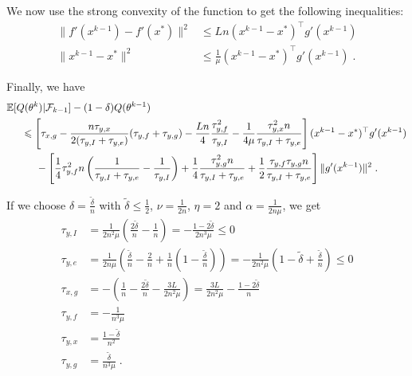 \documentclass{article}
\def\E{_{\scriptscriptstyle E}}
\def \E{{\mathbb E}}
\def \E{{\mathbb E}}
\begin{document}
We now use the strong convexity of the function to get the following inequalities:
\begin{align*}
\|f'(x^{k-1}) - f'(x^\ast)\|^2 & \leqslant Ln (x^{k-1} -x^\ast)^\top g'(x^{k-1})\\
\|x^{k-1} -x^\ast\|^2& \leqslant\frac{1}{\mu}(x^{k-1} -x^\ast)^\top g'(x^{k-1}) \; .
\end{align*}

Finally, we have
\begin{align*}
& \E [ Q(\theta^k) | \mathcal{F}_{k-1} ] - ( 1 - \delta) Q(\theta^{k-1}) \\
& \hspace*{.5cm} \leqslant \left[\tau_{x,g} - \frac{n\tau_{y,x}}{2(\tau_{y,I} + \tau_{y,e})}(\tau_{y,f} + \tau_{y,g}) -\frac{Ln}{4}\frac{\tau_{y, f}^2}{\tau_{y,I}}-\frac{1}{4\mu}\frac{\tau_{y,x}^2n}{\tau_{y,I} + \tau_{y,e}}\right](x^{k-1} -x^\ast)^\top g'(x^{k-1})\\
& \hspace*{1cm} -\left[\frac{1}{4}\tau_{y, f}^2n\left(\frac{1}{\tau_{y,I} + \tau_{y,e}} - \frac{1}{\tau_{y,I}}\right) + \frac{1}{4}\frac{\tau_{y,g}^2n}{\tau_{y,I} + \tau_{y,e}} + \frac{1}{2}\frac{\tau_{y,f}\tau_{y,g}n}{\tau_{y,I} + \tau_{y,e}}\right]\|g'(x^{k-1}) \|^2 \; .
\end{align*}

If we choose $\delta = \frac{\widetilde{\delta}}{n}$ with $\widetilde{\delta} \leqslant \frac{1}{2}$, $\nu = \frac{1}{2n}$, $\eta = 2$ and $\alpha = \frac{1}{2n\mu}$, we get
\begin{align*}
\tau_{y, I} &= \frac{1}{2n^2\mu} \left(\frac{2\widetilde{\delta}}{n} - \frac{1}{n}\right) = -\frac{1 - 2\widetilde{\delta}}{2n^3\mu} \leqslant 0\\
\tau_{y, e} &=\frac{1}{2n\mu} \left( \frac{\widetilde{\delta}}{n} - \frac{2}{n} + \frac{1}{n}\left(1 - \frac{\widetilde{\delta}}{n}\right)\right) = -\frac{1}{2n^2\mu}\left(1 - \widetilde{\delta} + \frac{\widetilde{\delta}}{n}\right) \leqslant 0\\
\tau_{x,g} & = -\left ( \frac{1}{n} - \frac{2\widetilde{\delta}}{n} - \frac{3L}{2n^2\mu} \right) = \frac{3 L}{2n^2\mu} - \frac{1 - 2\widetilde{\delta}}{n}\\
\tau_{y,f} &= - \frac{1}{n^3\mu}\\
\tau_{y,x}&= \frac{1 - \widetilde{\delta}}{n^2}\\
\tau_{y,g}&= \frac{\widetilde{\delta}}{n^3\mu}\; .
\end{align*}
\end{document}
